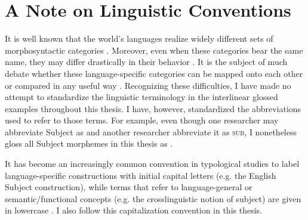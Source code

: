 \chapter*{A Note on Linguistic Conventions}

It is well known that the world's languages realize widely different sets of morphosyntactic categories \parencites[58]{Whaley1997}{Haspelmath2007}. Moreover, even when these categories bear the same name, they may differ drastically in their behavior \parencite[9]{Dixon2010}. It is the subject of much debate whether these language-specific categories can be mapped onto each other or compared in any useful way \parencites[13--19]{Croft2003}{Haspelmath2010a}{Haspelmath2010b}{Newmeyer2010}[308--310]{Hieber2013}{Croft2014}{Plank2016}. Recognizing these difficulties, I have made no attempt to standardize the linguistic terminology in the interlinear glossed examples throughout this thesis. I have, however, standardized the abbreviations used to refer to those terms. For example, even though one researcher may abbreviate Subject as  and another researcher abbreviate it as \textsc{sub}, I nonetheless gloss all Subject morphemes in this thesis as .

It has become an increasingly common convention in typological studies to label language\hyp{}specific constructions with initial capital letters (e.g. the English Subject construction), while terms that refer to language-general or semantic/functional concepts (e.g. the crosslinguistic notion of subject) are given in lowercase \parencites[674]{Haspelmath2010a}[535]{Croft2014}. I also follow this capitalization convention in this thesis.
